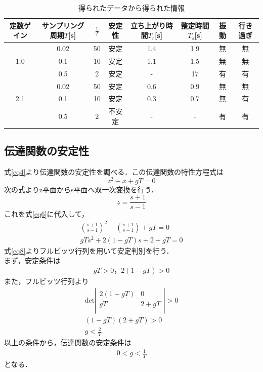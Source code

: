 \documentclass[11pt,a4paper]{jsarticle}
\begin{document}
\begin{table}[hb]
 \begin{center}
 \caption{得られたデータから得られた情報}
  \label{tab7}
  \begin{tabular}{|c|c|c|c|c|c|c|c|} \hline
   定数ゲイン & サンプリング周期$T$[s] & $\frac{1}{T}$ & 安定性 & 立ち上がり時間$T_r$[s] & 整定時間$T_s$[s] & 振動 & 行き過ぎ \\ \hline 
      & 0.02 & 50 & 安定   & 1.4 & 1.9 & 無 & 無 \\ \cline{2-8} 
  1.0 & 0.1  & 10 & 安定   & 1.1 & 1.5 & 無 & 無 \\ \cline{2-8}
      & 0.5  & 2  & 安定   &  -  & 17  & 有 & 有 \\ \hline
      & 0.02 & 50 & 安定   & 0.6 & 0.9 & 無 & 無 \\ \cline{2-8}
  2.1 & 0.1  & 10 & 安定   & 0.3 & 0.7 & 無 & 有 \\ \cline{2-8}
      & 0.5  & 2  & 不安定 &  -  &  -  & 有 & 有 \\ \hline
  \end{tabular}
 \end{center}
\end{table}



\subsection{伝達関数の安定性}
式\ref{eq4}より伝達関数の安定性を調べる．この伝達関数の特性方程式は
\begin{equation}
 z^2-x+gT = 0
  \label{eq6}
\end{equation}
次の式よりz平面からs平面へ双一次変換を行う．
\begin{equation}
 z = \frac{s+1}{s-1}
\end{equation}
これを式\ref{eq6}に代入して，
\begin{eqnarray}
 \left( \frac{s+1}{s-1} \right)^2 - \left( \frac{s+1}{s-1} \right)+gT = 0 \nonumber \\ \label{eq8}
 gTs^2 + 2(1-gT)s +2 + gT = 0
\end{eqnarray}
式\ref{eq8}よりフルビッツ行列を用いて安定判別を行う． \\
まず，安定条件は
\begin{eqnarray*}
 gT > 0，2(1-gT) > 0
\end{eqnarray*}
また，フルビッツ行列より
\begin{eqnarray*}
\mathrm{det} \left|
	      \begin{array}{ccc}
	       2(1-gT) &     0   \\
	          gT   &   2+gT  \\
	      \end{array}
	     \right| > 0 \\
 (1-gT)(2+gT) > 0 \\
 g < \frac{2}{T}
\end{eqnarray*}
以上の条件から，伝達関数の安定条件は
\begin{eqnarray*}
 0 < g < \frac{1}{T}
\end{eqnarray*}
となる．
\end{document}

